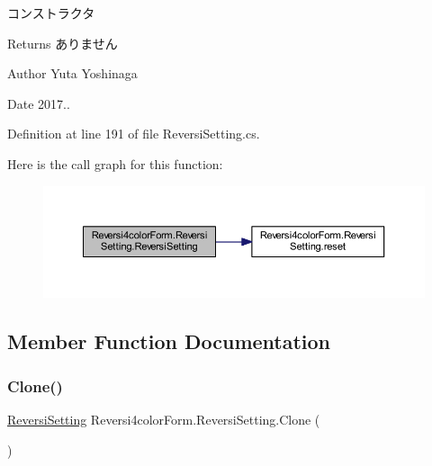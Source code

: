 コンストラクタ 

\begin{DoxyReturn}{Returns}
ありません 
\end{DoxyReturn}
\begin{DoxyAuthor}{Author}
Yuta Yoshinaga 
\end{DoxyAuthor}
\begin{DoxyDate}{Date}
2017.. 
\end{DoxyDate}


Definition at line 191 of file Reversi\+Setting.\+cs.

Here is the call graph for this function\+:\nopagebreak
\begin{figure}[H]
\begin{center}
\leavevmode
\includegraphics[width=350pt]{class_reversi4color_form_1_1_reversi_setting_a88a0c05a8cc876cc6c8ab87e9514f40b_cgraph}
\end{center}
\end{figure}


\subsection{Member Function Documentation}
\mbox{\label{class_reversi4color_form_1_1_reversi_setting_ab6acecf760ca4ca40ac5d498d56d33b6}} 
\subsubsection{\texorpdfstring{Clone()}{Clone()}}
{\footnotesize\ttfamily \hyperlink{class_reversi4color_form_1_1_reversi_setting}{Reversi\+Setting} Reversi4color\+Form.\+Reversi\+Setting.\+Clone (\begin{DoxyParamCaption}{ }\end{DoxyParamCaption})}



